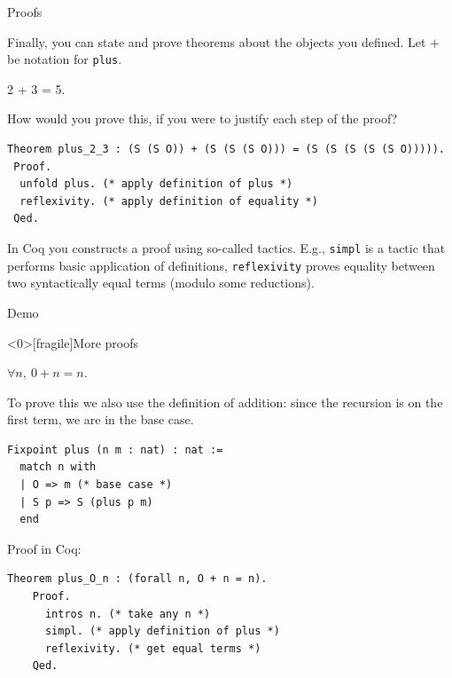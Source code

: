 \documentclass[10pt]{beamer}
\begin{document}
\begin{frame}[fragile]{Proofs}


  Finally, you can state and prove theorems about the objects you defined. Let $+$ be notation for \texttt{plus}.

  \begin{theorem} 2 + 3 = 5.
    \end{theorem}

  How would you prove this, if you were to justify each step of the proof?
  
  \begin{lstlisting}[language=Coq]
Theorem plus_2_3 : (S (S O)) + (S (S (S O))) = (S (S (S (S (S O))))).
 Proof.
  unfold plus. (* apply definition of plus *)
  reflexivity. (* apply definition of equality *)
 Qed.

  \end{lstlisting}
  In Coq you constructs a proof using so-called {\sf tactics}.
  E.g., \texttt{simpl} is a tactic that performs basic application of definitions, \texttt{reflexivity} proves equality between two syntactically equal terms (modulo some reductions).  
 
\end{frame}


\begin{frame}{Demo}
\end{frame}

\begin{frame}<0>[fragile]{More proofs}
\begin{theorem} $\forall n,\ 0 + n = n$.
\end{theorem}

To prove this we also use the definition of addition: since the recursion is on the first term, we are in the base case.

   \begin{lstlisting}[language=Coq]
  Fixpoint plus (n m : nat) : nat :=
  match n with
  | O => m (* base case *)
  | S p => S (plus p m)
  end
   \end{lstlisting}

   Proof in Coq:

  \begin{lstlisting}[language=Coq]
    Theorem plus_O_n : (forall n, O + n = n).
    Proof.
      intros n. (* take any n *)
      simpl. (* apply definition of plus *)
      reflexivity. (* get equal terms *)
    Qed.
  \end{lstlisting}

 
\end{frame}
\end{document}
